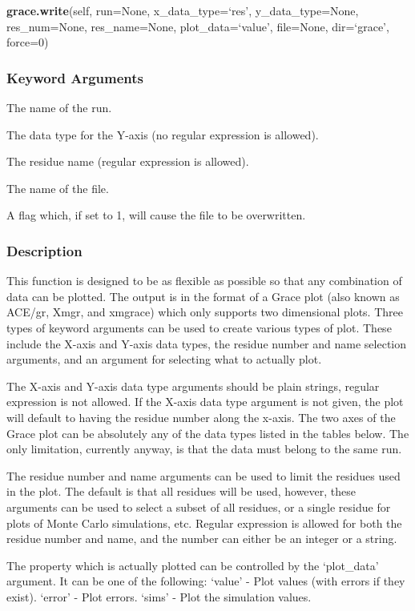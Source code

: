 \textsf{\textbf{grace.write}(self, run=None, x\_data\_type=`res', y\_data\_type=None, res\_num=None, res\_name=None, plot\_data=`value', file=None, dir=`grace', force=0)}


\subsubsection{Keyword Arguments}

  The name of the run.

  The data type for the Y-axis (no regular expression is allowed).

  The residue name (regular expression is allowed).

  The name of the file.

  A flag which, if set to 1, will cause the file to be overwritten.

\subsubsection{Description}

This function is designed to be as flexible as possible so that any combination of data can
be plotted.  The output is in the format of a Grace plot (also known as ACE/gr, Xmgr, and
xmgrace) which only supports two dimensional plots.  Three types of keyword arguments can
be used to create various types of plot.  These include the X-axis and Y-axis data types,
the residue number and name selection arguments, and an argument for selecting what to
actually plot.

The X-axis and Y-axis data type arguments should be plain strings, regular expression is not
allowed.  If the X-axis data type argument is not given, the plot will default to having the
residue number along the x-axis.  The two axes of the Grace plot can be absolutely any of
the data types listed in the tables below.  The only limitation, currently anyway, is that
the data must belong to the same run.

The residue number and name arguments can be used to limit the residues used in the plot.
The default is that all residues will be used, however, these arguments can be used to
select a subset of all residues, or a single residue for plots of Monte Carlo simulations,
etc.  Regular expression is allowed for both the residue number and name, and the number can
either be an integer or a string.

The property which is actually plotted can be controlled by the `plot\_data' argument.  It
can be one of the following:
    `value' - Plot values (with errors if they exist).
    `error' - Plot errors.
    `sims'   - Plot the simulation values.


